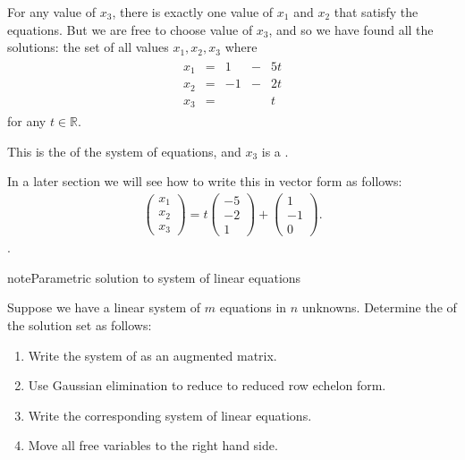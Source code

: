 \documentclass[letterpaper,10pt,english]{jupyterBook}
\begin{document}
\sphinxAtStartPar
For any value of \(x_3\), there is exactly one value of \(x_1\) and \(x_2\) that satisfy the equations. But we are free to choose  value of \(x_3\), and so we have found all the solutions: the set of all values \(x_1, x_2, x_3\) where
\begin{equation*}
\begin{split}
\begin{alignat*}{3}
x_1 & {}={} & 1 & {}-{} & 5t\\
x_2 & {}={} & -1 & {}-{} & 2t\\
x_3 & {}={} &  &  & t
\end{alignat*}\end{split}
\end{equation*}
\sphinxAtStartPar
for any \(t \in \mathbb{R}\).

\sphinxAtStartPar
This is the  of the system of equations, and \(x_3\) is a .

\sphinxAtStartPar
In a later section we will see how to write this in vector form as follows:
\begin{equation*}
\begin{split}
\begin{pmatrix}x_1\\x_2\\x_3\end{pmatrix} = t\begin{pmatrix}-5\\-2\\1\end{pmatrix} + \begin{pmatrix}1\\-1\\0\end{pmatrix}.
\end{split}
\end{equation*}
\sphinxAtStartPar
{}.

\begin{sphinxadmonition}{note}{Parametric solution to system of linear equations}

\sphinxAtStartPar
Suppose we have a linear system of \(m\) equations in \(n\) unknowns. Determine the  of the solution set as follows:
\begin{enumerate}
%
\item {} 
\sphinxAtStartPar
Write the system of as an augmented matrix.

\item {} 
\sphinxAtStartPar
Use Gaussian elimination to reduce to reduced row echelon form.

\item {} 
\sphinxAtStartPar
Write the corresponding system of linear equations.

\item {} 
\sphinxAtStartPar
Move all free variables to the right hand side.

\end{enumerate}
\end{sphinxadmonition}
\end{document}

